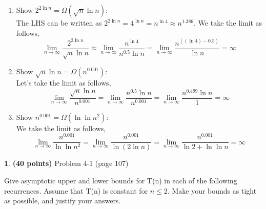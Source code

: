 \documentclass[11pt]{article}
\theoremstyle{definition}
\theoremstyle{theorem}
\newtheorem{prob}{}
\begin{document}
\begin{enumerate}
\item Show $2^{2\ln n} = \Omega(\sqrt{n} \ln n)$: \\
The LHS can be written as $2^{2\ln n} = 4^{\ln n} = n^{\ln 4} \approx n^{1.386}$. We take the limit as follows,
\[
\lim_{n \to \infty} \frac{2^{2\ln n}}{\sqrt{n} \ln n}
\approx \lim_{n \to \infty} \frac{n^{\ln 4}}{n^{0.5} \ln n}
= \lim_{n \to \infty} \frac{n^{((\ln 4) - 0.5)}}{\ln n} = \infty
\]

\item Show $\sqrt{n} \ln n = \Omega(n^{0.001})$: \\
Let's take the limit as follows,
\[
\lim_{n \to \infty} \frac{\sqrt{n} \ln n}{n^{0.001}}
= \lim_{n \to \infty} \frac{n^{0.5} \ln n}{n^{0.001}}
= \lim_{n \to \infty} \frac{n^{0.499} \ln n}{1}
= \infty
\]

\item Show $n^{0.001} = \Omega(\ln \ln n^2)$: \\
We take the limit as follows,
\[
\lim_{n \to \infty} \frac{n^{0.001}}{\ln \ln n^2}
= \lim_{n \to \infty} \frac{n^{0.001}}{\ln (2 \ln n)}
= \lim_{n \to \infty} \frac{n^{0.001}}{\ln 2 + \ln \ln n}
= \infty
\]

\end{enumerate}

\newpage
\begin{prob} \textbf{(40 points)} Problem 4-1 (page 107)
\end{prob}

Give asymptotic upper and lower bounds for T(n) in each of the following recurrences. Assume that T(n) is constant for $n \leq 2$. Make your bounds as tight as possible, and justify your answers.
\end{document}
